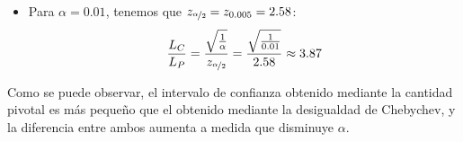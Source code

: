 \begin{ejemplo}
\begin{itemize}
        \item Para $\alpha = 0.01$, tenemos que $z_{\nicefrac{\alpha}{2}} = z_{0.005} = 2.58$:
        \begin{align*}
            \dfrac{L_C}{L_P} = \dfrac{\sqrt{\frac{1}{\alpha}}}{z_{\nicefrac{\alpha}{2}}} = \dfrac{\sqrt{\frac{1}{0.01}}}{2.58} \approx 3.87
        \end{align*}
    \end{itemize}

    Como se puede observar, el intervalo de confianza obtenido mediante la cantidad pivotal es más pequeño que el obtenido mediante la desigualdad de Chebychev, y la diferencia entre ambos aumenta a medida que disminuye $\alpha$.
\end{ejemplo}